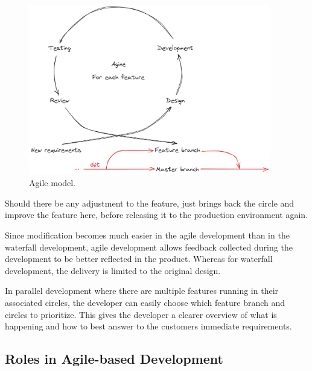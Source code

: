 \begin{figure}
	\centering
	\includegraphics[width=300pt]{chapters/ap/figures/agile.png}
	\caption{Agile model.} \label{ch:cicd:fig:agile}
\end{figure}

Should there be any adjustment to the feature, just brings back the circle and improve the feature here, before releasing it to the production environment again.

Since modification becomes much easier in the agile development than in the waterfall development, agile development allows feedback collected during the development to be better reflected in the product. Whereas for waterfall development, the delivery is limited to the original design.

In parallel development where there are multiple features running in their associated circles, the developer can easily choose which feature branch and circles to prioritize. This gives the developer a clearer overview of what is happening and how to best answer to the customers immediate requirements.

\subsection{Roles in Agile-based Development}

